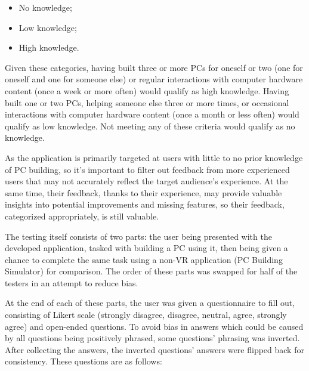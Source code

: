 \begin{itemize}
    \item No knowledge;
    \item Low knowledge;
    \item High knowledge.
\end{itemize}

Given these categories, having built three or more PCs for oneself or two (one for oneself and one for someone else) or regular interactions with computer hardware content (once a week or more often) would qualify as high knowledge.
Having built one or two PCs, helping someone else three or more times, or occasional interactions with computer hardware content (once a month or less often) would qualify as low knowledge.
Not meeting any of these criteria would qualify as no knowledge.

As the application is primarily targeted at users with little to no prior knowledge of PC building, so it's important to filter out feedback from more experienced users that may not accurately reflect the target audience's experience.
At the same time, their feedback, thanks to their experience, may provide valuable insights into potential improvements and missing features, so their feedback, categorized appropriately, is still valuable.

The testing itself consists of two parts: the user being presented with the developed application, tasked with building a PC using it, then being given a chance to complete the same task using a non-VR application (PC Building Simulator) for comparison.
The order of these parts was swapped for half of the testers in an attempt to reduce bias.

At the end of each of these parts, the user was given a questionnaire to fill out, consisting of Likert scale \cite{battertonLikertScaleWhat2017}
(strongly disagree, disagree, neutral, agree, strongly agree) and open-ended questions.
To avoid bias in answers which could be caused by all questions being positively phrased, some questions' phrasing was inverted.
After collecting the answers, the inverted questions' answers were flipped back for consistency.
These questions are as follows:

